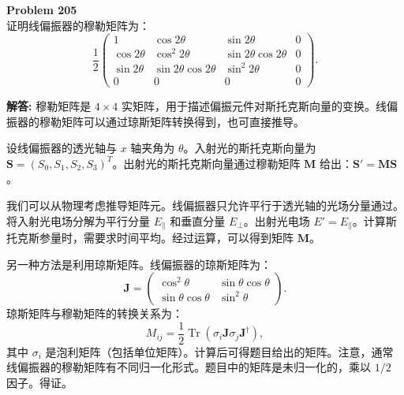 \documentclass[12pt, a4paper, oneside]{ctexart}
\newenvironment{solution}{\par\noindent\textbf{解答:}\quad}{\par}
\begin{document}
\begin{mdframed}[backgroundcolor=gray!10, linewidth=0pt]
    \textbf{Problem 205} \\
    证明线偏振器的穆勒矩阵为：
    \[
    \frac{1}{2} \begin{pmatrix}
        1 & \cos 2\theta & \sin 2\theta & 0 \\
        \cos 2\theta & \cos^2 2\theta & \sin 2\theta \cos 2\theta & 0 \\
        \sin 2\theta & \sin 2\theta \cos 2\theta & \sin^2 2\theta & 0 \\
        0 & 0 & 0 & 0
    \end{pmatrix}.
    \]
\end{mdframed}
\begin{solution}
    穆勒矩阵是 $4\times4$ 实矩阵，用于描述偏振元件对斯托克斯向量的变换。线偏振器的穆勒矩阵可以通过琼斯矩阵转换得到，也可直接推导。

    设线偏振器的透光轴与 $x$ 轴夹角为 $\theta$。入射光的斯托克斯向量为 $\mathbf{S} = (S_0, S_1, S_2, S_3)^T$。出射光的斯托克斯向量通过穆勒矩阵 $\mathbf{M}$ 给出：$\mathbf{S}' = \mathbf{M} \mathbf{S}$。

    我们可以从物理考虑推导矩阵元。线偏振器只允许平行于透光轴的光场分量通过。将入射光电场分解为平行分量 $E_{\parallel}$ 和垂直分量 $E_{\perp}$。出射光电场 $E' = E_{\parallel}$。计算斯托克斯参量时，需要求时间平均。经过运算，可以得到矩阵 $\mathbf{M}$。

    另一种方法是利用琼斯矩阵。线偏振器的琼斯矩阵为：
    \[
    \mathbf{J} = \begin{pmatrix} \cos^2\theta & \sin\theta\cos\theta \\ \sin\theta\cos\theta & \sin^2\theta \end{pmatrix}.
    \]
    琼斯矩阵与穆勒矩阵的转换关系为：
    \[
    M_{ij} = \frac{1}{2} \operatorname{Tr}(\sigma_i \mathbf{J} \sigma_j \mathbf{J}^\dagger),
    \]
    其中 $\sigma_i$ 是泡利矩阵（包括单位矩阵）。计算后可得题目给出的矩阵。注意，通常线偏振器的穆勒矩阵有不同归一化形式。题目中的矩阵是未归一化的，乘以 $1/2$ 因子。得证。
\end{solution}
\end{document}
